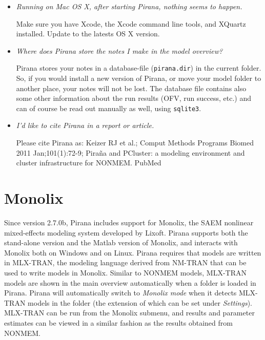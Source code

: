 {{{{\begin{itemize}
 \item \textit{Running on Mac OS X, after starting Pirana, nothing seems to happen.}

 \vspace{5pt}
 Make sure you have Xcode, the Xcode command line tools, and XQuartz installed. Update to the latests OS X version.

 \item \textit{Where does Pirana store the notes I make in the model overview?}

\vspace{5pt} Pirana stores your notes in a database-file ({\tt pirana.dir}) in the current folder. So, if you would install a new version of Pirana, or move your model folder to another place, your notes will not be lost. The database file contains also some other information about the run results (OFV, run success, etc.) and can of course be read out manually as well, using {\tt sqlite3}.

\item \textit{I'd like to cite Pirana in a report or article.}

\vspace{5pt} Please cite Pirana as: Keizer RJ et al.; Comput Methods Programs Biomed 2011 Jan;101(1):72-9; Pira\~na and PCluster: a modeling environment and cluster infrastructure for NONMEM. PubMed

\end{itemize}


\clearpage
\section{Monolix}
Since version 2.7.0b, Pirana includes support for Monolix, the SAEM nonlinear mixed-effects modeling
system developed by Lixoft. Pirana supports both the stand-alone version and the Matlab version of Monolix,
and interacts with Monolix both on Windows and on Linux. Pirana requires that models are
written in MLX-TRAN, the modeling language derived from NM-TRAN that can be used to write models in
Monolix. Similar to NONMEM models, MLX-TRAN models are shown in the main overview automatically when
a folder is loaded in Pirana. Pirana will automatically switch to \textit{Monolix mode} when it detects
MLX-TRAN models in the folder (the extension of which can be set under \textit{Settings}). MLX-TRAN can be run from the Monolix submenu,
and results and parameter estimates can be viewed in a similar fashion as the results obtained from NONMEM.

}}}}

